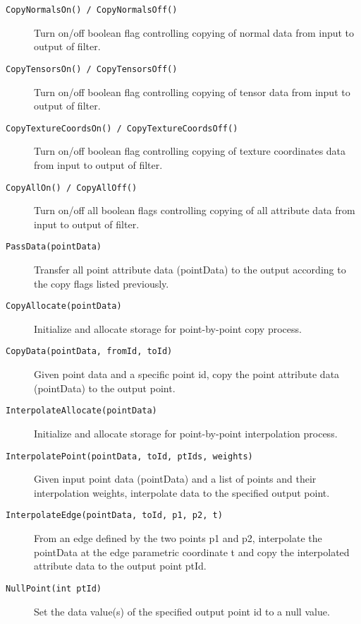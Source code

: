 \begin{description}
\begin{description}
    \item[\texttt{CopyNormalsOn() / CopyNormalsOff()}]
    Turn on/off boolean flag controlling copying of normal data from input to output of filter.

    \item[\texttt{CopyTensorsOn() / CopyTensorsOff()}]
    Turn on/off boolean flag controlling copying of tensor data from input to output of filter.

    \item[\texttt{CopyTextureCoordsOn() / CopyTextureCoordsOff()}]
    Turn on/off boolean flag controlling copying of texture coordinates data from input to output of filter.

    \item[\texttt{CopyAllOn() / CopyAllOff()}]
    Turn on/off all boolean flags controlling copying of all attribute data from input to output of filter.

    \item[\texttt{PassData(pointData)}]
    Transfer all point attribute data (pointData) to the output according to the copy flags listed previously.

    \item[\texttt{CopyAllocate(pointData)}]
    Initialize and allocate storage for point-by-point copy process.

    \item[\texttt{CopyData(pointData, fromId, toId)}]
    Given point data and a specific point id, copy the point attribute data (pointData) to the output point.

    \item[\texttt{InterpolateAllocate(pointData)}]
    Initialize and allocate storage for point-by-point interpolation process.

    \item[\texttt{InterpolatePoint(pointData, toId, ptIds, weights)}]
    Given input point data (pointData) and a list of points and their interpolation weights, interpolate data to the specified output point.

    \item[\texttt{InterpolateEdge(pointData, toId, p1, p2, t)}]
    From an edge defined by the two points p1 and p2, interpolate the pointData at the edge parametric coordinate t and copy the interpolated attribute data to the output point ptId.

    \item[\texttt{NullPoint(int ptId)}]
    Set the data value(s) of the specified output point id to a null value.


\end{description}
\end{description}
